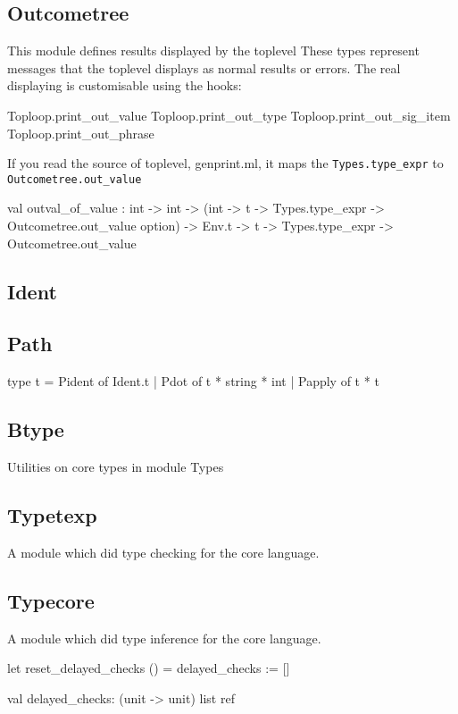 \subsection{Outcometree}

This module defines results displayed by the toplevel These types
represent messages that the toplevel displays as normal results or
errors. The real displaying is customisable using the hooks:

\begin{ocamlcode}
Toploop.print_out_value 
Toploop.print_out_type
Toploop.print_out_sig_item
Toploop.print_out_phrase
\end{ocamlcode}

If you read the source of toplevel, genprint.ml, it maps the
\verb|Types.type_expr| to \verb|Outcometree.out_value|
\begin{ocamlcode}
    val outval_of_value :
          int -> int ->
          (int -> t -> Types.type_expr -> Outcometree.out_value option) ->
          Env.t -> t -> Types.type_expr -> Outcometree.out_value
\end{ocamlcode}


\subsection{Ident}

\subsection{Path}


\begin{ocamlcode}
type t =
    Pident of Ident.t
  | Pdot of t * string * int
  | Papply of t * t
\end{ocamlcode}

\subsection{Btype}
Utilities on core types in module Types

\subsection{Typetexp}
A module which did type checking for the core language.


\subsection{Typecore}
A module which did type inference for the core language.
\begin{ocamlcode}
let reset_delayed_checks () = delayed_checks := []
\end{ocamlcode}
\begin{ocamlcode}
val delayed_checks: (unit -> unit) list ref 
\end{ocamlcode}

